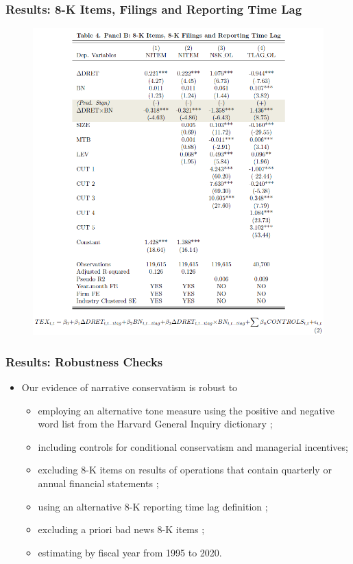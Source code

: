 \documentclass{beamer}
\begin{document}
\begin{frame}
\frametitle{Results: 8-K Items, Filings and Reporting Time Lag}
	\begin{figure}[h]
	\centering
	\includegraphics[width=0.9\linewidth]{tab4panB}
	\label{tab4panB}
	\end{figure}
\end{frame}
\begin{frame}
	\frametitle{Results: Robustness Checks}
\begin{itemize}
	\item Our evidence of narrative conservatism is robust to 
	\begin{itemize}
		\item employing an alternative tone measure using the positive and negative word list from the Harvard General Inquiry dictionary \citep{loughranTextualAnalysisAccounting2016};
		\item including controls for conditional conservatism and managerial incentives;
		\item excluding 8-K items on results of operations that contain quarterly or annual financial statements \citep{segalAreManagersStrategic2016};
		\item using an alternative 8-K reporting time lag definition \citep{carterRelevanceForm8K1999, niessnerStrategicDisclosureTiming2015, chapmanInformationOverloadDisclosure2019};
		\item excluding a priori bad news 8-K items \citep{segalAreManagersStrategic2016};
		\item estimating by fiscal year from 1995 to 2020.
	\end{itemize}
\end{itemize}
\end{frame}
\end{document}
